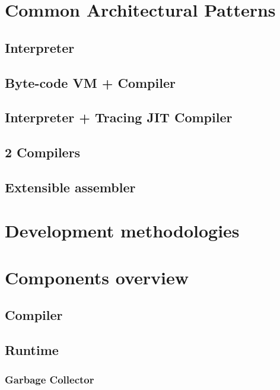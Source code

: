 \section{Common Architectural Patterns}

\subsection{Interpreter}

\subsection{Byte-code VM + Compiler}

\subsection{Interpreter + Tracing JIT Compiler}

\subsection{2 Compilers}

\subsection{Extensible assembler}


\section{Development methodologies}



\section{Components overview}

\subsection{Compiler}

\subsection{Runtime}

\subsubsection{Garbage Collector}

